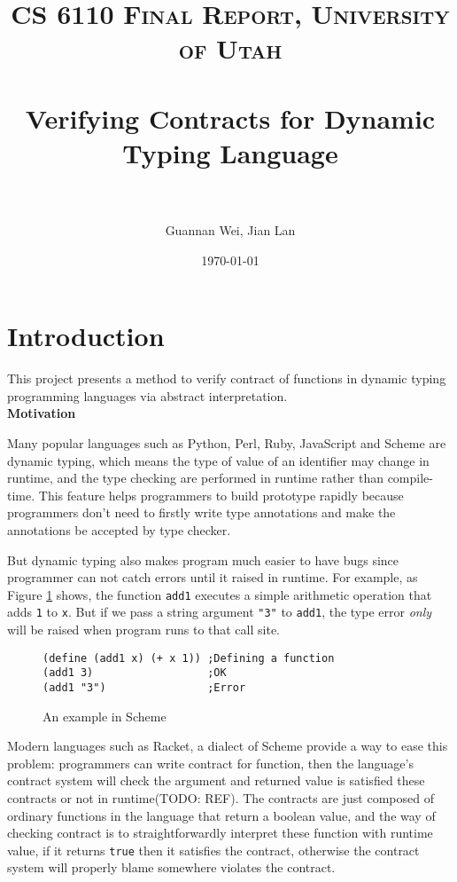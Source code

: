 \documentclass[paper=a4, fontsize=11pt]{scrartcl} %
\title{	
\normalfont \normalsize 
\textsc{CS 6110 Final Report, University of Utah} \\ [25pt] %
\horrule{0.5pt} \\[0.4cm] %
\huge Verifying Contracts for Dynamic Typing Language \\ %
\horrule{2pt} \\[0.5cm] %
}
\author{Guannan Wei, Jian Lan} %
\date{\normalsize\today} %
\numberwithin{equation}{section} %
\numberwithin{figure}{section} %
\numberwithin{table}{section} %
\begin{document}
\maketitle %

\section{Introduction}

This project presents a method to verify contract of functions in dynamic typing programming languages via abstract interpretation. \\

\textbf{Motivation}

Many popular languages such as Python, Perl, Ruby, JavaScript and Scheme are dynamic typing, which means the type of value of an identifier may change in runtime, and the type checking are performed in runtime rather than compile-time. This feature helps programmers to build prototype rapidly because programmers don't need to firstly write type annotations and make the annotations be accepted by type checker.

But dynamic typing also makes program much easier to have bugs since programmer can not catch errors until it raised in runtime. For example, as Figure \ref{fig:example} shows, the function \texttt{add1} executes a simple arithmetic operation that adds \texttt{1} to \texttt{x}. But if we pass a string argument \texttt{"3"} to \texttt{add1}, the type error \textit{only} will be raised when program runs to that call site.

\begin{figure}[h!]
\lstset{language=Lisp}
\begin{lstlisting}[frame=single]
(define (add1 x) (+ x 1)) ;Defining a function
(add1 3)                  ;OK
(add1 "3")                ;Error
\end{lstlisting} 
\caption{An example in Scheme}
\label{fig:example}
\end{figure}

Modern languages such as Racket, a dialect of Scheme provide a way to ease this problem: programmers can write contract for function, then the language's contract system will check the argument and returned value is satisfied these contracts or not in runtime(TODO: REF). The contracts are just composed of ordinary functions in the language that return a boolean value, and the way of checking contract is to straightforwardly interpret these function with runtime value, if it returns \texttt{true} then it satisfies the contract, otherwise the contract system will properly blame somewhere violates the contract.
\end{document}
